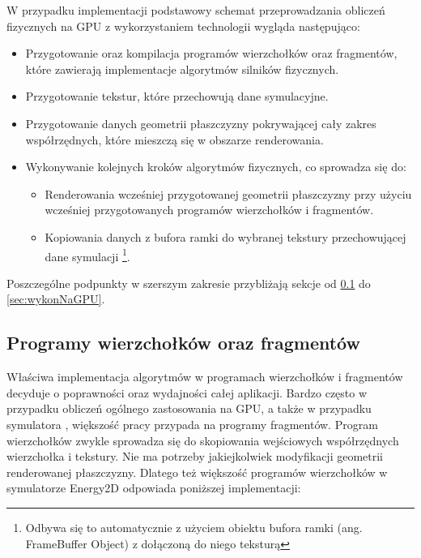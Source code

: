 W przypadku implementacji  podstawowy schemat przeprowadzania
obliczeń fizycznych na GPU z wykorzystaniem technologii  wygląda
następująco:

\begin{itemize}

\item Przygotowanie oraz kompilacja programów wierzchołków oraz fragmentów,
które zawierają implementacje algorytmów silników fizycznych.

\item Przygotowanie tekstur, które przechowują dane symulacyjne. 

\item Przygotowanie danych geometrii płaszczyzny pokrywającej cały zakres
współrzędnych, które mieszczą się w obszarze renderowania.

\item Wykonywanie kolejnych kroków algorytmów fizycznych, co sprowadza się do:
	
	\begin{itemize}
	\item Renderowania wcześniej przygotowanej geometrii płaszczyzny przy użyciu
	wcześniej przygotowanych programów wierzchołków i fragmentów.

  \item Kopiowania danych z bufora ramki do wybranej tekstury przechowującej
	dane symulacji \footnote{Odbywa się to automatycznie z użyciem obiektu bufora 
  ramki (ang. FrameBuffer Object) z dołączoną do niego teksturą}.
	\end{itemize}

\end{itemize}

Poszczególne podpunkty w szerszym zakresie przybliżają sekcje od \ref{sec:progWierzFrag} do
\ref{sec:wykonNaGPU}.

\subsection{Programy wierzchołków oraz fragmentów}
\label{sec:progWierzFrag}

Właściwa implementacja algorytmów w programach wierzchołków i fragmentów
decyduje o poprawności oraz wydajności całej aplikacji. Bardzo często w
przypadku obliczeń ogólnego zastosowania na GPU, a także w przypadku
symulatora , większość pracy przypada na programy fragmentów.
Program wierzchołków zwykle sprowadza się do skopiowania wejściowych
współrzędnych wierzchołka i tekstury. Nie ma potrzeby jakiejkolwiek
modyfikacji geometrii renderowanej płaszczyzny. Dlatego też większość
programów wierzchołków w symulatorze Energy2D odpowiada poniższej
implementacji:

